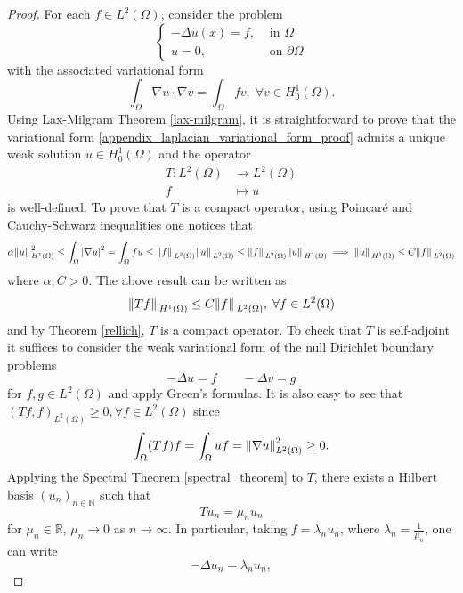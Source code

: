 \begin{proof}
    For each \(f \in L^2(\Omega)\), consider the problem
    \[
        \begin{cases}
            -\Delta u(x) = f, & \text{ in } \Omega\\
            u = 0, & \text{ on } \partial \Omega
        \end{cases} 
    \]
    with the associated variational form
    \begin{equation}\label{appendix_laplacian_variational_form_proof}
        \int_\Omega \nabla u \cdot \nabla v = \int_\Omega f v, \; \forall v \in H^1_0(\Omega).
    \end{equation}
    Using Lax-Milgram Theorem \ref{lax-milgram}, it is straightforward to prove that the variational form \eqref{appendix_laplacian_variational_form_proof} admits a unique weak solution \(u \in H^1_0(\Omega)\) and the operator
    \begin{align*}
        T: L^2(\Omega) &\rightarrow L^2(\Omega)\\
        f &\mapsto u
    \end{align*}
    is well-defined. To prove that \(T\) is a compact operator, using Poincaré and Cauchy-Schwarz inequalities one notices that
    \[
        \alpha\norm*{u}_{H^1(\Omega)}^2 \leq \int_\Omega \abs{\nabla u}^2 = \int_\Omega f u \leq \norm*{f}_{L^2(\Omega)}\norm*{u}_{L^2(\Omega)} \leq \norm*{f}_{L^2(\Omega)}\norm*{u}_{H^1(\Omega)} \implies \norm*{u}_{H^1(\Omega)} \leq C \norm*{f}_{L^2(\Omega)}
    \]
    where \(\alpha, C > 0\). The above result can be written as
    \[
        \norm*{Tf}_{H^1(\Omega)} \leq C \norm*{f}_{L^2(\Omega)}, \; \forall f \in L^2(\Omega)
    \]
    and by Theorem \ref{rellich}, \(T\) is a compact operator. To check that \(T\) is self-adjoint it suffices to consider the weak variational form of the null Dirichlet boundary problems
    \[
        -\Delta u = f \qquad -\Delta v = g
    \]
    for \(f,g \in L^2(\Omega)\) and apply Green's formulas. It is also easy to see that \((Tf, f)_{L^2(\Omega)} \geq 0, \forall f \in L^2(\Omega)\) since 
    \[
        \int_\Omega (Tf) f = \int_\Omega u f = \norm{\nabla u}_{L^2(\Omega)}^2 \geq 0.
    \]
    Applying the Spectral Theorem \ref{spectral_theorem} to \(T\), there exists a Hilbert basis \((u_n)_{n \in \mathbb{N}}\) such that
    \[
        T u_n = \mu_n u_n
    \]
    for \(\mu_n \in \mathbb{R}\), \(\mu_n \rightarrow 0\) as \(n \rightarrow \infty\). In particular, taking \(f = \lambda_n u_n\), where \(\lambda_n = \frac{1}{\mu_n}\), one can write
    \[
        -\Delta u_n = \lambda_n u_n,
\]
\end{proof}
